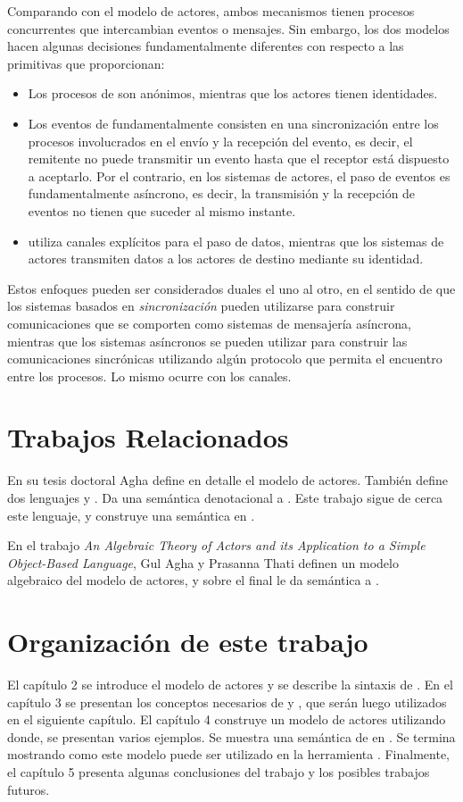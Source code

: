 Comparando \CSP con el modelo de actores, ambos mecanismos tienen procesos concurrentes que intercambian eventos o mensajes. Sin embargo, los dos modelos hacen algunas decisiones fundamentalmente diferentes con respecto a las primitivas que proporcionan:

\begin{itemize}
\item Los procesos de \CSP son anónimos, mientras que los actores tienen identidades.
\item Los eventos de \CSP fundamentalmente consisten en una sincronización entre los procesos involucrados en el envío y la recepción del evento, es decir, el remitente no puede transmitir un evento hasta que el receptor está dispuesto a aceptarlo. Por el contrario, en los sistemas de actores, el paso de eventos es fundamentalmente asíncrono, es decir, la transmisión y la recepción de eventos no tienen que suceder al mismo instante.
\item \CSP utiliza canales explícitos para el paso de datos, mientras que los sistemas de actores transmiten datos a los actores de destino mediante su identidad.
\end{itemize}

Estos enfoques pueden ser considerados duales el uno al otro, en el sentido de que los sistemas basados en \emph{sincronización} pueden utilizarse para construir comunicaciones que se comporten como sistemas de mensajería asíncrona, mientras que los sistemas asíncronos se pueden utilizar para construir las comunicaciones sincrónicas utilizando algún protocolo que permita el encuentro entre los procesos. Lo mismo ocurre con los canales.

\section{Trabajos Relacionados}

En su tesis doctoral Agha\cite{Agha:1986:AMC:7929} define en detalle el modelo de actores. También define dos lenguajes \SAL y \ACT. Da una semántica denotacional a \SAL. Este trabajo sigue de cerca este lenguaje, y construye una semántica en \CSP.

En el trabajo \textit{An Algebraic Theory of Actors and its Application to a Simple Object-Based Language}\cite{apicalculus}, Gul Agha y Prasanna Thati definen un modelo algebraico del modelo de actores, y sobre el final le da semántica a \SAL.

\section{Organización de este trabajo}

El capítulo 2 se introduce el modelo de actores y se describe la sintaxis de \SAL. En el capítulo 3 se presentan los conceptos necesarios de \CSP y \CSPm, que serán luego utilizados en el siguiente capítulo. El capítulo 4 construye un modelo de actores utilizando \CSP donde, se presentan varios ejemplos. Se muestra una semántica de \SAL en \CSP. Se termina mostrando como este modelo puede ser utilizado en la herramienta \FDR. Finalmente, el capítulo 5 presenta algunas conclusiones del trabajo y los posibles trabajos futuros.
